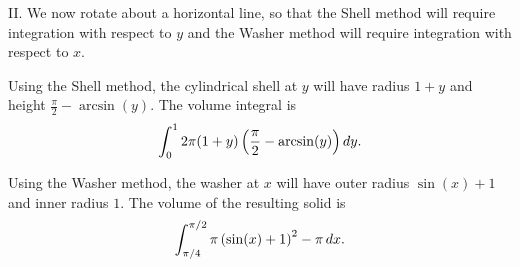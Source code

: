 \documentclass[]{ximera}
\begin{document}
\begin{freeResponse}
II. We now rotate about a horizontal line, so that the Shell method will require integration with respect to $y$ and the Washer method will require integration with respect to $x$. 

Using the Shell method, the cylindrical shell at $y$ will have radius $1+y$ and height $\frac{\pi}{2} - \arcsin(y)$. The volume integral is
$$
\int_0^1 2 \pi (1+y) \left(\frac{\pi}{2} - \arcsin (y) \right) \mathop{}\!d y.
$$

Using the Washer method, the washer at $x$ will have outer radius $\sin (x) + 1$ and inner radius $1$. The volume of the resulting solid is
$$
\int_{\pi/4}^{\pi/2} \pi \left(\sin (x) + 1\right)^2 - \pi \mathop{}\!d x.
$$

\end{freeResponse}
\end{document}
